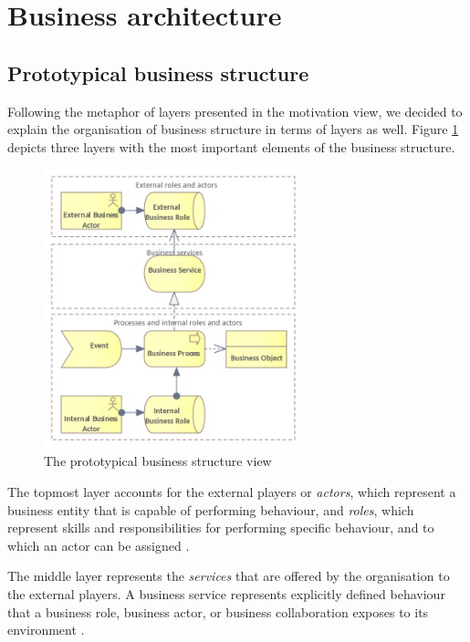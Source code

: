 \section{Business architecture}
\label{sec:business-architecture}

	\subsection{Prototypical business structure}
	
	Following the metaphor of layers presented in the motivation view, we decided to explain the  organisation of business structure in terms of layers as well. Figure \ref{fig:business-structure-protopypical} depicts three layers with the most important elements of the business structure. 
	
	\begin{figure}[h]
		\centering
		\includegraphics[width=0.67\textwidth]{images/views/Business view.png}
		\caption{The prototypical business structure view}
		\label{fig:business-structure-protopypical}
	\end{figure} 
	
	The topmost layer accounts for the external players or \textit{actors}, which represent a business entity that is capable of performing behaviour, and \textit{roles}, which represent skills and responsibilities for performing specific behaviour, and to which an actor can be assigned \citep{archimate3.1}. 
	
	The middle layer represents the \textit{services} that are offered by the organisation to the external players. A business service represents explicitly defined behaviour that a business role, business actor, or business collaboration exposes to its environment \citep{archimate3.1}.
	
